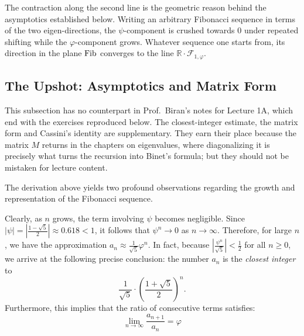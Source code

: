 \begin{remark}
The contraction along the second line is the geometric reason behind the asymptotics
established below. Writing an arbitrary Fibonacci sequence in terms of the two
eigen-directions, the $\psi$-component is crushed towards $0$ under repeated shifting
while the $\varphi$-component grows. Whatever sequence one starts from, its direction
in the plane $\operatorname{Fib}$ converges to the line $\mathbb{R} \cdot \mathcal{F}_{1,\varphi}$.
\end{remark}

\subsection{The Upshot: Asymptotics and Matrix Form}

\begin{ainote}
This subsection has no counterpart in Prof.\ Biran's notes for Lecture 1A, which
end with the exercises reproduced below. The closest-integer estimate, the matrix
form and Cassini's identity are supplementary. They earn their place because the
matrix $M$ returns in the chapters on eigenvalues, where diagonalizing it is
precisely what turns the recursion into Binet's formula; but they should not be
mistaken for lecture content.
\end{ainote}

The derivation above yields two profound observations regarding the growth and representation of the Fibonacci sequence.

\begin{importantremark}
Clearly, as $n$ grows, the term involving $\psi$ becomes negligible. Since $|\psi| = |\frac{1-\sqrt{5}}{2}| \approx 0.618 < 1$, it follows that $\psi^n \to 0$ as $n \to \infty$. Therefore, for large $n$, we have the approximation $a_n \approx \frac{1}{\sqrt{5}} \varphi^n$. In fact, because $\left| \frac{\psi^n}{\sqrt{5}} \right| < \frac{1}{2}$ for all $n \ge 0$, we arrive at the following precise conclusion:
the number $a_n$ is the \textit{closest integer} to
\[
\frac{1}{\sqrt{5}} \cdot \left(\frac{1+\sqrt{5}}{2}\right)^n.
\]
Furthermore, this implies that the ratio of consecutive terms satisfies:
\begin{equation}
\lim_{n \to \infty} \frac{a_{n+1}}{a_n} = \varphi
\end{equation}
\end{importantremark}

